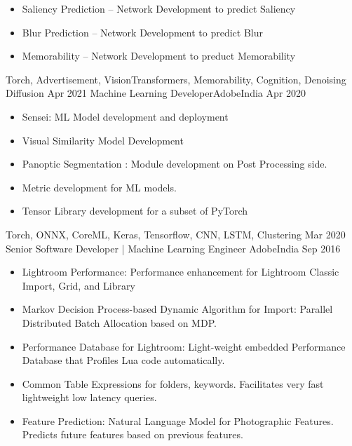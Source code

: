 \begin{experiences}
{\begin{itemize}
			\item Saliency Prediction -- Network Development to predict Saliency
			\item Blur Prediction -- Network Development to predict Blur
			\item Memorability -- Network Development to preduct Memorability
		\end{itemize}
	}
	{Torch, Advertisement,  VisionTransformers,  Memorability, Cognition, Denoising Diffusion}
	\emptySeparator
  \experience
    {Apr 2021}   {Machine Learning Developer}{Adobe}{India}
    {Apr 2020} {
                      \begin{itemize}
                        \item Sensei: ML Model development and deployment
                        \item Visual Similarity Model Development 
                        \item Panoptic Segmentation : Module development on Post Processing side.
                        \item Metric development for ML models.
                        \item Tensor Library development for a subset of PyTorch
                      \end{itemize}
                    }
                    {Torch, ONNX, CoreML, Keras, Tensorflow, CNN, LSTM, Clustering}
  \emptySeparator
  \experience 
  {Mar 2020}
  {Senior Software Developer | Machine Learning Engineer}
  {Adobe}{India}
  {Sep 2016}
  {
  	\begin{itemize}
  	
  	\item Lightroom Performance: Performance enhancement for Lightroom Classic Import, Grid, and Library
  	
  	\item Markov Decision Process-based Dynamic Algorithm for Import: Parallel Distributed Batch Allocation based on MDP.                     
  	
  	\item Performance Database for Lightroom: Light-weight embedded Performance Database that Profiles Lua code automatically.
  	
  	\item Common Table Expressions for folders, keywords. Facilitates very fast lightweight low latency queries.                
  	
  	\item Feature Prediction: Natural Language Model for Photographic Features. Predicts future features based on previous features.
  	

\end{itemize}}
\end{experiences}
